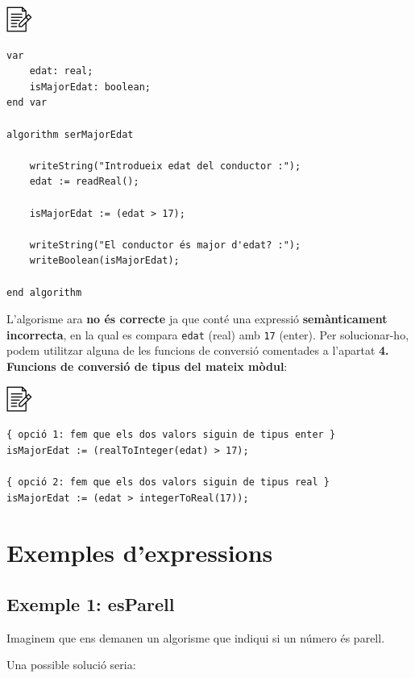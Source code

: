 \documentclass[
]{book}
\begin{document}
\includegraphics{./img/alg.png}

\begin{verbatim}
var
    edat: real;
    isMajorEdat: boolean;
end var

algorithm serMajorEdat

    writeString("Introdueix edat del conductor :");
    edat := readReal();

    isMajorEdat := (edat > 17);

    writeString("El conductor és major d'edat? :");
    writeBoolean(isMajorEdat);

end algorithm
\end{verbatim}

L'algorisme ara \textbf{no és correcte} ja que conté una expressió \textbf{semànticament incorrecta}, en la qual es compara \texttt{edat} (real) amb \texttt{17} (enter). Per solucionar-ho, podem utilitzar alguna de les funcions de conversió comentades a l'apartat \textbf{4. Funcions de conversió de tipus del mateix mòdul}:

\includegraphics{./img/alg.png}

\begin{verbatim}
{ opció 1: fem que els dos valors siguin de tipus enter }
isMajorEdat := (realToInteger(edat) > 17);    

{ opció 2: fem que els dos valors siguin de tipus real }
isMajorEdat := (edat > integerToReal(17));
\end{verbatim}

\hypertarget{exemples-dexpressions}{%
\section{Exemples d'expressions}\label{exemples-dexpressions}}

\hypertarget{exemple-1-esparell}{%
\subsection{Exemple 1: esParell}\label{exemple-1-esparell}}

Imaginem que ens demanen un algorisme que indiqui si un número és parell.

Una possible solució seria:
\end{document}
